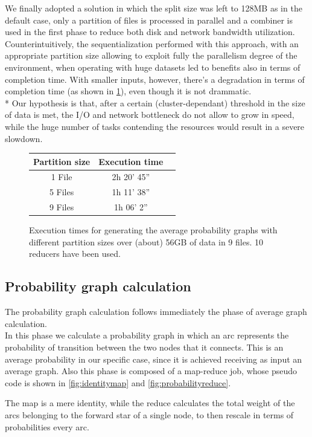 We finally adopted a solution in which the split size was left to 128MB as in the default case, only a partition of files is processed in parallel and a combiner is used in the first phase to reduce both disk and network bandwidth utilization.
Counterintuitively, the sequentialization performed with this approach, with an appropriate partition size allowing to exploit fully the parallelism degree of the environment, when operating with huge datasets led to benefits also in terms of completion time. 
With smaller inputs, however, there's a degradation in terms of completion time (as shown in \ref{fig:partitioningtimes}), even though it is not drammatic.
\\*
Our hypothesis is that, after a certain (cluster-dependant) threshold in the size of data is met, the I/O and network bottleneck do not allow to grow in speed, while the huge number of tasks contending the resources would result in a severe slowdown.

\begin{figure}
\centering
\begin{tabular}{| c | c | r |}
\hline
\textbf{Partition size} & \textbf{Execution time} \\
\hline
1 File & 2h 20' 45'' \\
\hline
5 Files &  1h 11' 38''\\
\hline
9 Files & 1h 06' 2'' \\
\hline
\end{tabular}
\caption{Execution times for generating the average probability graphs with different partition sizes over (about) 56GB of data in 9 files. 10 reducers have been used.}
\label{fig:partitioningtimes}
\end{figure}


\subsection{Probability graph calculation}
The probability graph calculation follows immediately the phase of average graph calculation.\\
In this phase we calculate a probability graph in which an arc represents the probability of transition between the two nodes that it connects. 
This is an average probability in our specific case, since it is achieved receiving as input an average graph.
Also this phase is composed of a map-reduce job, whose pseudo code is shown in \ref{fig:identitymap} and \ref{fig:probabilityreduce}.

The map is a mere identity, while the reduce calculates the total weight of the arcs belonging to the forward star of a single node, to then rescale in terms of probabilities every arc.
  
